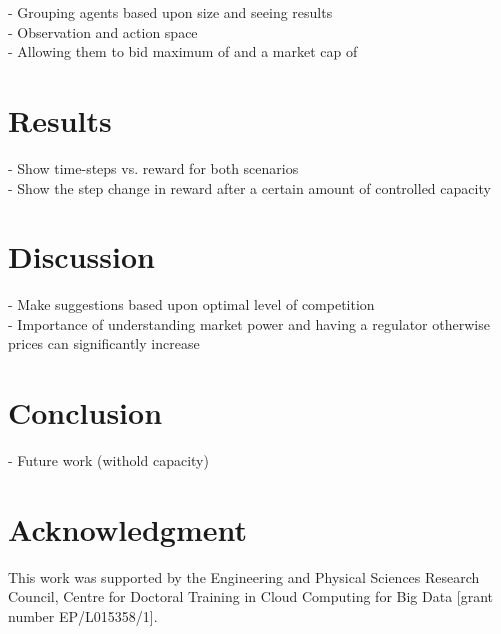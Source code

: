 \documentclass[conference]{IEEEtran}
\begin{document}
- Grouping agents based upon size and seeing results\\
- Observation and action space \\
- Allowing them to bid maximum of  and a market cap of 



\section{Results}

- Show time-steps vs. reward for both scenarios \\
- Show the step change in reward after a certain amount of controlled capacity

\section{Discussion}

- Make suggestions based upon optimal level of competition \\
- Importance of understanding market power and having a regulator otherwise prices can significantly increase

\section{Conclusion}

- Future work (withold capacity)


\section{Acknowledgment}

This work was supported by the Engineering and Physical Sciences Research Council, Centre for Doctoral Training in Cloud Computing for Big Data [grant number EP/L015358/1].





\end{document}
